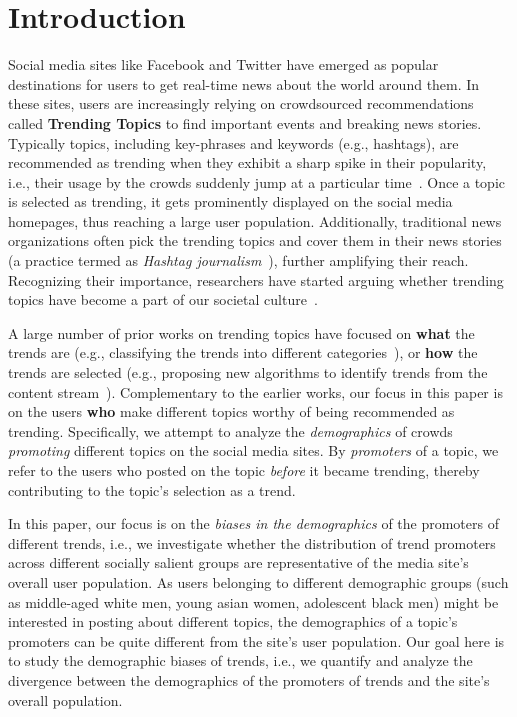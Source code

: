 \documentclass[letterpaper]{article}
\begin{document}
\section{Introduction}
\label{sec:intro}
\noindent Social media sites like Facebook and Twitter have emerged as
popular destinations for users to get real-time news about the world
around them. In these sites, users are increasingly relying on
crowdsourced recommendations called {\bf Trending Topics} to find
important events and breaking news stories.  Typically topics,
including key-phrases and keywords (e.g., hashtags), are recommended
as trending when they exhibit a sharp spike in their popularity, i.e.,
their usage by the crowds suddenly jump at a particular
time~\cite{twitter_trends}.  Once a topic is selected as trending, it
gets prominently displayed on the social media homepages, thus
reaching a large user population.  Additionally, traditional news
organizations often pick the trending topics and cover them in their
news stories (a practice termed as {\it Hashtag
  journalism}~\cite{Friedman2014Hashtag}), further amplifying their
reach.  Recognizing their importance, researchers have started arguing
whether trending topics have become a part of our societal
culture~\cite{gillespie2016trendingistrending}.

A large number of prior works on trending topics have focused on {\bf
  what} the trends are (e.g., classifying the trends into different
categories~\cite{naaman2011hip}), or {\bf how} the trends are selected
(e.g., proposing new algorithms to identify trends from the content
stream~\cite{benhardus2013streaming}).  Complementary to the earlier
works, our focus in this paper is on the users {\bf who} make
different topics worthy of being recommended as
trending. Specifically, we attempt to analyze the {\it demographics}
of crowds {\it promoting} different topics on the social media
sites. By {\it promoters} of a topic, we refer to the users who posted
on the topic {\it before} it became trending, thereby contributing to
the topic's selection as a trend. 

In this paper, our focus is on the {\it biases in the demographics} of
the promoters of different trends, i.e., we investigate whether the
distribution of trend promoters across different socially salient
groups are representative of the media site's overall user
population. As users belonging to different demographic groups (such
as middle-aged white men, young asian women, adolescent black men)
might be interested in posting about different topics, the
demographics of a topic's promoters can be quite different from the
site's user population. Our goal here is to study the demographic
biases of trends, i.e., we quantify and analyze the divergence between
the demographics of the promoters of trends and the site's overall population.
\end{document}

